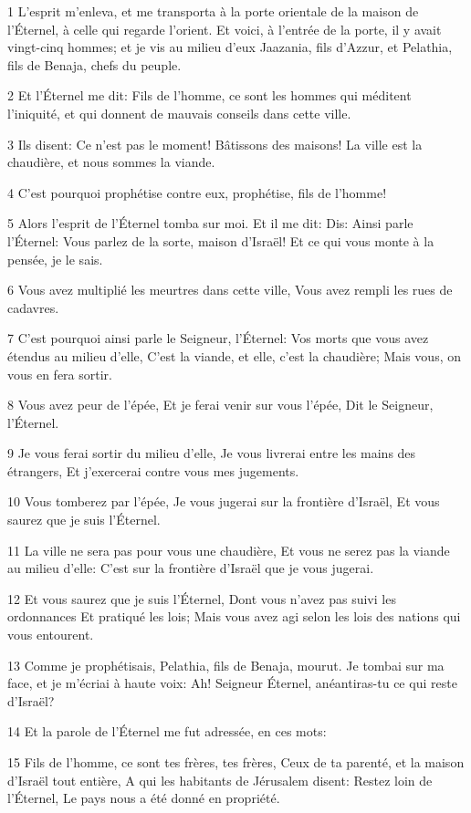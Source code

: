 \par 1 L'esprit m'enleva, et me transporta à la porte orientale de la maison de l'Éternel, à celle qui regarde l'orient. Et voici, à l'entrée de la porte, il y avait vingt-cinq hommes; et je vis au milieu d'eux Jaazania, fils d'Azzur, et Pelathia, fils de Benaja, chefs du peuple.
\par 2 Et l'Éternel me dit: Fils de l'homme, ce sont les hommes qui méditent l'iniquité, et qui donnent de mauvais conseils dans cette ville.
\par 3 Ils disent: Ce n'est pas le moment! Bâtissons des maisons! La ville est la chaudière, et nous sommes la viande.
\par 4 C'est pourquoi prophétise contre eux, prophétise, fils de l'homme!
\par 5 Alors l'esprit de l'Éternel tomba sur moi. Et il me dit: Dis: Ainsi parle l'Éternel: Vous parlez de la sorte, maison d'Israël! Et ce qui vous monte à la pensée, je le sais.
\par 6 Vous avez multiplié les meurtres dans cette ville, Vous avez rempli les rues de cadavres.
\par 7 C'est pourquoi ainsi parle le Seigneur, l'Éternel: Vos morts que vous avez étendus au milieu d'elle, C'est la viande, et elle, c'est la chaudière; Mais vous, on vous en fera sortir.
\par 8 Vous avez peur de l'épée, Et je ferai venir sur vous l'épée, Dit le Seigneur, l'Éternel.
\par 9 Je vous ferai sortir du milieu d'elle, Je vous livrerai entre les mains des étrangers, Et j'exercerai contre vous mes jugements.
\par 10 Vous tomberez par l'épée, Je vous jugerai sur la frontière d'Israël, Et vous saurez que je suis l'Éternel.
\par 11 La ville ne sera pas pour vous une chaudière, Et vous ne serez pas la viande au milieu d'elle: C'est sur la frontière d'Israël que je vous jugerai.
\par 12 Et vous saurez que je suis l'Éternel, Dont vous n'avez pas suivi les ordonnances Et pratiqué les lois; Mais vous avez agi selon les lois des nations qui vous entourent.
\par 13 Comme je prophétisais, Pelathia, fils de Benaja, mourut. Je tombai sur ma face, et je m'écriai à haute voix: Ah! Seigneur Éternel, anéantiras-tu ce qui reste d'Israël?
\par 14 Et la parole de l'Éternel me fut adressée, en ces mots:
\par 15 Fils de l'homme, ce sont tes frères, tes frères, Ceux de ta parenté, et la maison d'Israël tout entière, A qui les habitants de Jérusalem disent: Restez loin de l'Éternel, Le pays nous a été donné en propriété.
